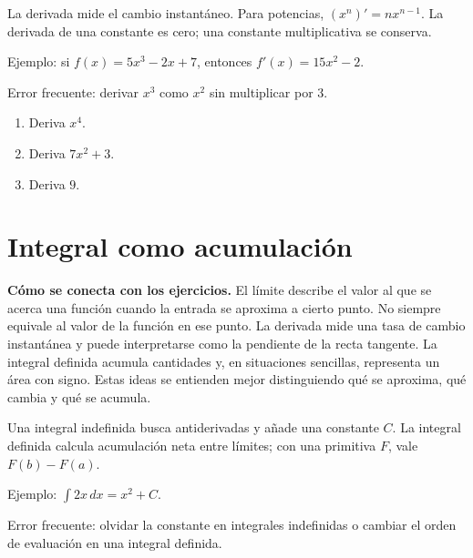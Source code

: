 \documentclass[10pt,oneside,openany]{book}
\begin{document}
La derivada mide el cambio instantáneo. Para potencias, $(x^n)'=nx^{n-1}$. La derivada de una constante es cero; una constante multiplicativa se conserva.

\begin{ejemplo}
Ejemplo: si $f(x)=5x^3-2x+7$, entonces $f'(x)=15x^2-2$.
\end{ejemplo}

\begin{ojo}
Error frecuente: derivar $x^3$ como $x^2$ sin multiplicar por 3.
\end{ojo}

\begin{practica}

\begin{enumerate}

\item Deriva $x^4$.

\item Deriva $7x^2+3$.

\item Deriva $9$.

\end{enumerate}

\end{practica}



\section{Integral como acumulación}

\textbf{Cómo se conecta con los ejercicios.} El límite describe el valor al que se acerca una función cuando la entrada se aproxima a cierto punto. No siempre equivale al valor de la función en ese punto. La derivada mide una tasa de cambio instantánea y puede interpretarse como la pendiente de la recta tangente. La integral definida acumula cantidades y, en situaciones sencillas, representa un área con signo. Estas ideas se entienden mejor distinguiendo qué se aproxima, qué cambia y qué se acumula.

Una integral indefinida busca antiderivadas y añade una constante $C$. La integral definida calcula acumulación neta entre límites; con una primitiva $F$, vale $F(b)-F(a)$.

\begin{ejemplo}
Ejemplo: $\int 2x\,dx=x^2+C$.
\end{ejemplo}

\begin{ojo}
Error frecuente: olvidar la constante en integrales indefinidas o cambiar el orden de evaluación en una integral definida.
\end{ojo}
\end{document}
